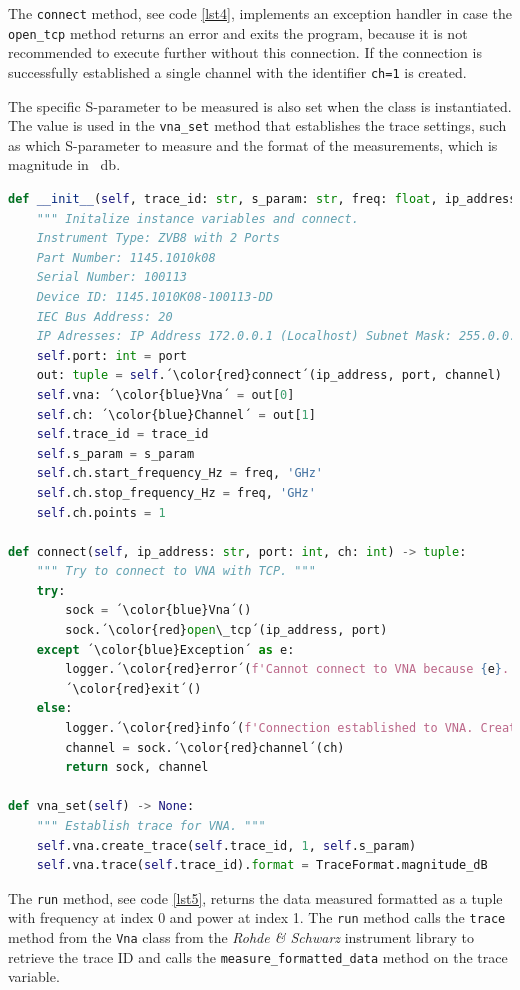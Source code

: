 The \verb+connect+ method, see code \ref{lst4}, implements an exception handler in case the \verb+open_tcp+ method returns an error and exits the program, because it is not recommended to execute further without this connection. If the connection is successfully established a single channel with the identifier \verb+ch=1+ is created. 

The specific S-parameter to be measured is also set when the class is instantiated. The value is used in the \verb+vna_set+ method that establishes the trace settings, such as which S-parameter to measure and the format of the measurements, which is magnitude in \SI{}{\decibel}.

\begin{lstlisting}[language=Python, caption=Method for initialisation of VNA settings including creating VNA trace.]
def __init__(self, trace_id: str, s_param: str, freq: float, ip_address = '172.0.0.1', port: int = 5025, channel = 1) -> None:
    """ Initalize instance variables and connect.
    Instrument Type: ZVB8 with 2 Ports
    Part Number: 1145.1010k08
    Serial Number: 100113
    Device ID: 1145.1010K08-100113-DD
    IEC Bus Address: 20
    IP Adresses: IP Address 172.0.0.1 (Localhost) Subnet Mask: 255.0.0.0 """
    self.port: int = port
    out: tuple = self.´\color{red}connect´(ip_address, port, channel)
    self.vna: ´\color{blue}Vna´ = out[0]
    self.ch: ´\color{blue}Channel´ = out[1]
    self.trace_id = trace_id
    self.s_param = s_param
    self.ch.start_frequency_Hz = freq, 'GHz'
    self.ch.stop_frequency_Hz = freq, 'GHz'
    self.ch.points = 1

def connect(self, ip_address: str, port: int, ch: int) -> tuple:
    """ Try to connect to VNA with TCP. """
    try:
        sock = ´\color{blue}Vna´()
        sock.´\color{red}open\_tcp´(ip_address, port)
    except ´\color{blue}Exception´ as e:
        logger.´\color{red}error´(f'Cannot connect to VNA because {e}.')
        ´\color{red}exit´()
    else:
        logger.´\color{red}info´(f'Connection established to VNA. Creating channel {ch}.')
        channel = sock.´\color{red}channel´(ch)
        return sock, channel

def vna_set(self) -> None:
    """ Establish trace for VNA. """
    self.vna.create_trace(self.trace_id, 1, self.s_param)
    self.vna.trace(self.trace_id).format = TraceFormat.magnitude_dB
\end{lstlisting} \label{lst4}

The \verb+run+ method, see code \ref{lst5}, returns the data measured formatted as a tuple with frequency at index 0 and power at index 1. The \verb+run+ method calls the \verb+trace+ method from the \verb+Vna+ class from the \textit{Rohde \& Schwarz} instrument library to retrieve the trace ID and calls the \verb+measure_formatted_data+ method on the trace variable. 

